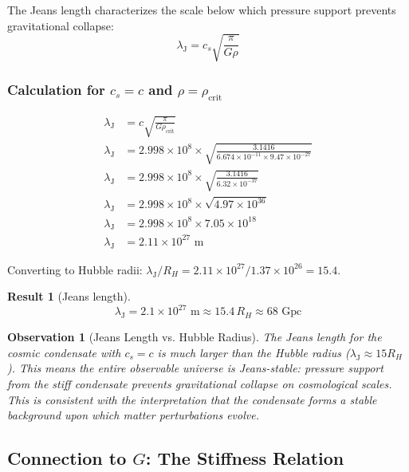 \documentclass[11pt,a4paper]{article}
\newcommand{\ee}[1]{\times 10^{#1}}
\newcommand{\rhocrit}{\ensuremath{\rho_{\mathrm{crit}}}}
\newcommand{\lambdaJ}{\ensuremath{\lambda_{\mathrm{J}}}}
\newtheorem{result}{Result}
\newtheorem{observation}{Observation}
\begin{document}
The Jeans length characterizes the scale below which pressure support prevents gravitational collapse:
\begin{equation}
\lambdaJ = c_s \sqrt{\frac{\pi}{G\rho}}
\end{equation}

\subsubsection{Calculation for $c_s = c$ and $\rho = \rhocrit$}

\begin{align}
\lambdaJ &= c \sqrt{\frac{\pi}{G \rhocrit}} \nonumber \\
\lambdaJ &= 2.998 \ee{8} \times \sqrt{\frac{3.1416}{6.674 \ee{-11} \times 9.47 \ee{-27}}} \nonumber \\
\lambdaJ &= 2.998 \ee{8} \times \sqrt{\frac{3.1416}{6.32 \ee{-37}}} \nonumber \\
\lambdaJ &= 2.998 \ee{8} \times \sqrt{4.97 \ee{36}} \nonumber \\
\lambdaJ &= 2.998 \ee{8} \times 7.05 \ee{18} \nonumber \\
\lambdaJ &= 2.11 \ee{27} \text{ m}
\end{align}

Converting to Hubble radii: $\lambdaJ / R_H = 2.11 \ee{27} / 1.37 \ee{26} = 15.4$.

\begin{result}[Jeans length]
\begin{equation}
\boxed{\lambdaJ = 2.1 \times 10^{27} \text{ m} \approx 15.4 \, R_H \approx 68 \text{ Gpc}}
\end{equation}
\end{result}

\begin{observation}[Jeans Length vs. Hubble Radius]
The Jeans length for the cosmic condensate with $c_s = c$ is \emph{much larger} than the Hubble radius ($\lambdaJ \approx 15 R_H$). This means the entire observable universe is \emph{Jeans-stable}: pressure support from the stiff condensate prevents gravitational collapse on cosmological scales. This is consistent with the interpretation that the condensate forms a stable background upon which matter perturbations evolve.
\end{observation}

\subsection{Connection to $G$: The Stiffness Relation}
\end{document}
